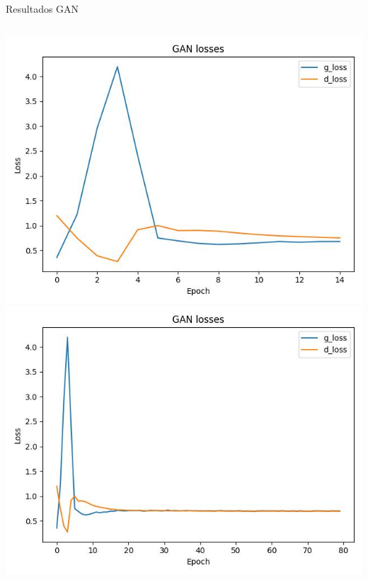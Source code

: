\documentclass{beamer}
\begin{document}
\begin{frame}{Resultados GAN}
  \vspace{0.5cm}
  \begin{center}
  \begin{columns}
    \column{5.5cm}
    \hspace*{0.5cm}\includegraphics[width=1\textwidth]{images/GAN-loss-14.jpeg}
    \column{5.5cm}
    \includegraphics[width=1\textwidth]{images/GAN-loss-80.jpeg}
  \end{columns}
\end{center}
\end{frame}
\end{document}
